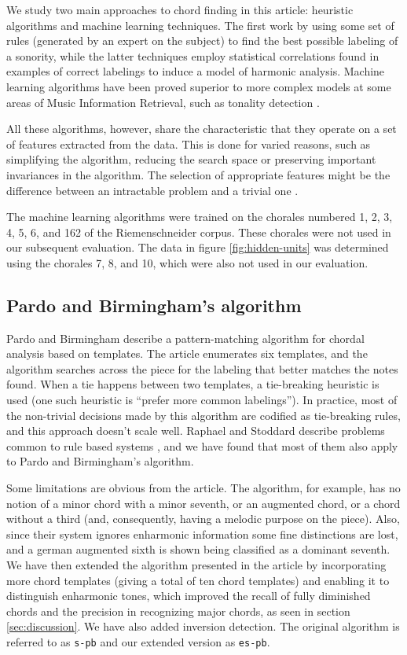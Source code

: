\documentclass{article}
\begin{document}
We study two main approaches to chord finding in this article:
heuristic algorithms and machine learning techniques. The first work
by using some set of rules (generated by an expert on the subject) to
find the best possible labeling of a sonority, while the latter
techniques employ statistical correlations found in examples of
correct labelings to induce a model of harmonic analysis. Machine
learning algorithms have been proved superior to more complex models
at some areas of Music Information Retrieval, such as tonality
detection \cite{gomez.ea:estimating}.

All these algorithms, however, share the characteristic that they
operate on a set of features extracted from the data. This is done for
varied reasons, such as simplifying the algorithm, reducing the search
space or preserving important invariances in the algorithm. The
selection of appropriate features might be the difference between an
intractable problem and a trivial one \cite{duda.ea:statistical}.

The machine learning algorithms were trained on the chorales numbered
1, 2, 3, 4, 5, 6, and 162 of the Riemenschneider corpus. These
chorales were not used in our subsequent evaluation. The data in
figure \ref{fig:hidden-units} was determined using the chorales 7, 8,
and 10, which were also not used in our evaluation.

\subsection{Pardo and Birmingham's algorithm}
\label{sec:pardo}


Pardo and Birmingham \cite{pardo.ea:algorithms} describe a
pattern-matching algorithm for chordal analysis based on templates.
The article enumerates six templates, and the algorithm searches
across the piece for the labeling that better matches the notes found.
When a tie happens between two templates, a tie-breaking heuristic is
used (one such heuristic is ``prefer more common labelings''). In
practice, most of the non-trivial decisions made by this algorithm are
codified as tie-breaking rules, and this approach doesn't scale
well. Raphael and Stoddard describe problems common to rule based
systems \cite{raphael.ea:harmonic}, and we have found that most of
them also apply to Pardo and Birmingham's algorithm.

Some limitations are obvious from the article. The algorithm, for
example, has no notion of a minor chord with a minor seventh, or an
augmented chord, or a chord without a third (and, consequently, having
a melodic purpose on the piece). Also, since their system ignores
enharmonic information some fine distinctions are lost, and a german
augmented sixth is shown being classified as a dominant seventh. We
have then extended the algorithm presented in the article by
incorporating more chord templates (giving a total of ten chord
templates) and enabling it to distinguish enharmonic tones, which
improved the recall of fully diminished chords and the precision in
recognizing major chords, as seen in section \ref{sec:discussion}.  We
have also added inversion detection. The original algorithm is
referred to as \texttt{s-pb} and our extended version as
\texttt{es-pb}.
\end{document}
